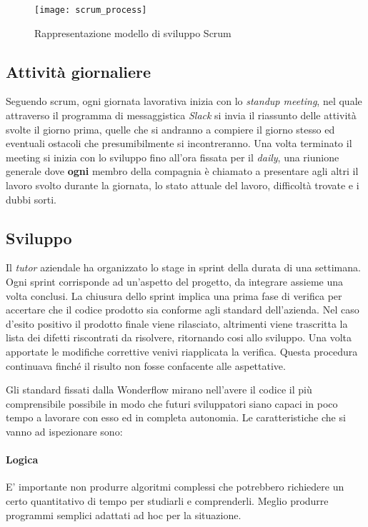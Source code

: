 \begin{figure}[ht]
\begin{center}
\texttt{[image: scrum\_process]}
\caption{Rappresentazione modello di sviluppo Scrum}
\label{fig:scrum_process}
\end{center}
\end{figure}

\subsection{Attività giornaliere}
Seguendo \gls{scrum}, ogni giornata lavorativa inizia con lo
\textit{standup meeting}, nel quale attraverso il programma di messaggistica
\textit{Slack} si invia il riassunto delle attività svolte il giorno prima,
quelle che si andranno a compiere il giorno stesso ed eventuali ostacoli che
presumibilmente si incontreranno. Una volta terminato il meeting si inizia con
lo sviluppo fino all'ora fissata per il \textit{daily}, una riunione generale
dove \textbf{ogni} membro della compagnia è chiamato a presentare agli altri il
lavoro svolto durante la giornata, lo stato attuale del lavoro, difficoltà
trovate e i dubbi sorti.

\subsection{Sviluppo}
Il \textit{tutor} aziendale ha organizzato lo stage in \gls{sprint} della
durata di una settimana. Ogni \gls{sprint} corrisponde ad un'aspetto del
progetto, da integrare assieme una volta conclusi. La chiusura dello
\gls{sprint} implica una prima fase di \gls{verifica} per accertare che il
codice prodotto sia conforme agli standard dell'azienda. Nel caso d'esito
positivo il prodotto finale viene rilasciato, altrimenti viene trascritta la
lista dei difetti riscontrati da risolvere, ritornando cosi allo sviluppo. Una
volta apportate le modifiche correttive venivi riapplicata la verifica. Questa
procedura continuava finché il risulto non fosse confacente alle aspettative.
\newline

Gli standard fissati dalla Wonderflow mirano nell'avere il codice il più
comprensibile possibile in modo che futuri sviluppatori siano capaci in poco
tempo a lavorare con esso ed in completa autonomia. Le caratteristiche che si
vanno ad ispezionare sono:
\paragraph{Logica}
E' importante non produrre algoritmi complessi che potrebbero richiedere un
certo quantitativo di tempo per studiarli e comprenderli. Meglio produrre
programmi semplici adattati ad hoc per la situazione.

